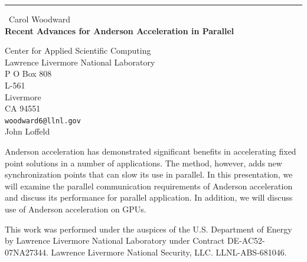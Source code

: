 \documentclass{report}
\begin{document}
\begin{center}
\rule{6in}{1pt} \
{\large Carol Woodward \\
{\bf Recent Advances for Anderson Acceleration in Parallel}}

Center for Applied Scientific Computing \\ Lawrence Livermore National Laboratory \\ P O Box 808 \\ L-561 \\ Livermore \\ CA 94551
\\
{\tt woodward6@llnl.gov}\\
John Loffeld\end{center}

Anderson acceleration has demonstrated significant benefits in
accelerating fixed point solutions in a number of applications. The
method, however, adds new synchronization points that can slow its use in
parallel. In this presentation, we will examine the parallel
communication requirements of Anderson acceleration and discuss its
performance for parallel application. In addition, we will discuss use of
Anderson acceleration on GPUs.

This work was performed under the auspices of the U.S. Department of
Energy by Lawrence Livermore National Laboratory under Contract
DE-AC52-07NA27344. Lawrence Livermore National Security, LLC.
LLNL-ABS-681046.
\end{document}
